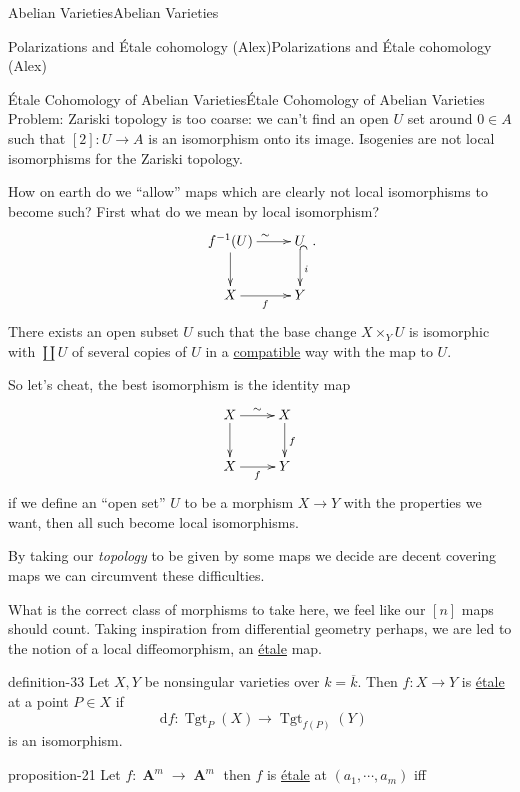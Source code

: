 \documentclass[10pt,]{book}
\numberwithin{equation}{section}
\newcommand{\diff}{\mathop{}\!\mathrm{d}}
\newcommand{\lb}{[}
\newcommand{\rb}{]}
\DeclareMathOperator{\Tgt}{Tgt}
\DeclareMathOperator{\aff}{\mathbf{A}}
\begin{document}
\begin{chapterptx}{Abelian Varieties}{}{Abelian Varieties}{}{}
\begin{sectionptx}{Polarizations and Étale cohomology (Alex)}{}{Polarizations and Étale cohomology (Alex)}{}{}
\begin{subsectionptx}{Étale Cohomology of Abelian Varieties}{}{Étale Cohomology of Abelian Varieties}{}{}
\hypertarget{p-266}{}%
Problem: Zariski topology is too coarse: we can't find an open \(U\) set around \(0 \in A\) such that \(\lb 2\rb \colon U \to A\) is an isomorphism onto its image. Isogenies are not local isomorphisms for the Zariski topology.%
\par
\hypertarget{p-267}{}%
How on earth do we ``allow'' maps which are clearly not local isomorphisms to become such? First what do we mean by local isomorphism?%
\begin{equation*}
\xymatrix{
f^{-1}(U)\ar[d] \ar[r]^{\sim} & U\ar@{^(->}[d]^i\\
X \ar[r]_f & Y
}\text{.}
\end{equation*}
There exists an open subset \(U\) such that the base change \(X \times_Y U\) is isomorphic with \(\coprod U\) of several copies of \(U\) in a \hyperref[def-buntes-compat]{compatible} way with the map to \(U\).%
\par
\hypertarget{p-268}{}%
So let's cheat, the best isomorphism is the identity map%
\begin{equation*}
\xymatrix{
X\ar[d] \ar[r]^{\sim} & X\ar[d]^f\\
X \ar[r]_f & Y
}
\end{equation*}
if we define an ``open set'' \(U\) to be a morphism \(X \to Y\) with the properties we want, then all such become local isomorphisms.%
\par
\hypertarget{p-269}{}%
By taking our \emph{topology} to be given by some maps we decide are decent covering maps we can circumvent these difficulties.%
\par
\hypertarget{p-270}{}%
What is the correct class of morphisms to take here, we feel like our \(\lb n\rb\) maps should count. Taking inspiration from differential geometry perhaps, we are led to the notion of a local diffeomorphism, an \hyperref[def-etale]{étale} map.%
\begin{definition}{}{definition-33}%
\hypertarget{p-271}{}%
Let \(X,Y\) be nonsingular varieties over \(k = \overline k\). Then \(f\colon X\to Y\) is \hyperref[def-etale]{étale} at a point \(P\in X\) if%
\begin{equation*}
\diff f\colon\Tgt_{P}(X) \to \Tgt_{f(P)} (Y)
\end{equation*}
is an isomorphism.%
\end{definition}
\begin{proposition}{}{}{proposition-21}%
\hypertarget{p-272}{}%
Let \(f \colon \aff^m\to \aff^m\) then \(f\) is \hyperref[def-etale]{étale} at \((a_1, \cdots, a_m)\) iff%
\begin{equation*}

\end{equation*}
\end{proposition}
\end{subsectionptx}
\end{sectionptx}
\end{chapterptx}
\end{document}
